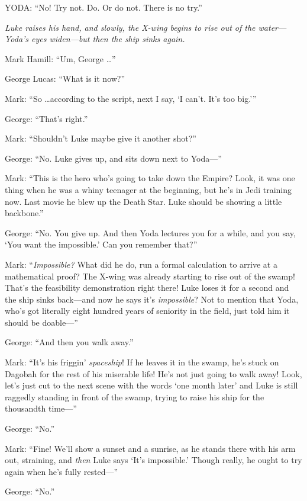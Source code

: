 {
 YODA: ``No! Try not. Do. Or do not. There is no
try.''}

{
 \textit{Luke raises his hand, and slowly, the X-wing begins to
rise out of the water---Yoda's eyes widen---but then
the ship sinks again.}}

{
 Mark Hamill: ``Um, George
\ldots''}

{
 George Lucas: ``What is it
now?''}

{
 Mark: ``So \ldots according to the script, next I
say, `I can't. It's too
big.'''}

{
 George: ``That's
right.''}

{
 Mark: ``Shouldn't Luke maybe give
it another shot?''}

{
 George: ``No. Luke gives up, and sits down next
to Yoda---''}

{
 Mark: ``This is the hero who's
going to take down the Empire? Look, it was one thing when he was a
whiny teenager at the beginning, but he's in Jedi
training now. Last movie he blew up the Death Star. Luke should be
showing a little backbone.''}

{
 George: ``No. You give up. And then Yoda lectures
you for a while, and you say, `You want the
impossible.' Can you remember
that?''}

{
 Mark: ``\textit{Impossible?} What did he do, run
a formal calculation to arrive at a mathematical proof? The X-wing was
already starting to rise out of the swamp! That's the
feasibility demonstration right there! Luke loses it for a second and
the ship sinks back---and now he says it's
\textit{impossible}? Not to mention that Yoda, who's
got literally eight hundred years of seniority in the field, just told
him it should be doable---''}

{
 George: ``And then you walk
away.''}

{
 Mark: ``It's his
friggin' \textit{spaceship}! If he leaves it in the
swamp, he's stuck on Dagobah for the rest of his
miserable life! He's not just going to walk away! Look,
let's just cut to the next scene with the words
`one month later' and Luke is still
raggedly standing in front of the swamp, trying to raise his ship for
the thousandth time---''}

{
 George: ``No.''}

{
 Mark: ``Fine! We'll show a sunset
and a sunrise, as he stands there with his arm out, straining, and
\textit{then} Luke says `It's
impossible.' Though really, he ought to try again when
he's fully rested---''}

{
 George: ``No.''}

